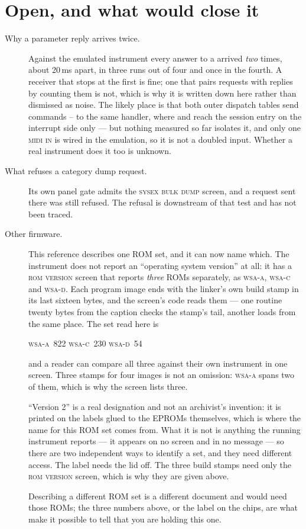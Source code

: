 \section{Open, and what would close it}
\begin{description}
\item[Why a parameter reply arrives twice.] Against the emulated instrument every answer
  to a  arrived \emph{two} times, about 20\,ms apart, in three runs out of four
  and once in the fourth. A receiver that stops at the first is fine; one that pairs
  requests with replies by counting them is not, which is why it is written down here
  rather than dismissed as noise. The likely place is that both outer dispatch tables send
  commands -- to the same handler, where  and 
  reach the session entry on the interrupt side only --- but nothing measured so far
  isolates it, and only one \textsc{midi in} is wired in the emulation, so it is not a
  doubled input. Whether a real instrument does it too is unknown.

\item[What refuses a category dump request.] Its own panel gate admits the
  \textsc{sysex bulk dump} screen, and a request sent there was still refused. The refusal
  is downstream of that test and has not been traced.

\item[Other firmware.] This reference describes one ROM set, and it can now name which.
  The instrument does not report an ``operating system version'' at all: it has a
  \textsc{rom version} screen that reports \emph{three} ROMs separately, as
  \textsc{wsa-a}, \textsc{wsa-c} and \textsc{wsa-d}. Each program image ends with the
  linker's own build stamp in its last sixteen bytes, and the screen's code reads them ---
  one routine twenty bytes from the caption checks the stamp's tail, another loads from
  the same place. The set read here is

  \begin{center}
  \textsc{wsa-a}~822 \qquad \textsc{wsa-c}~230 \qquad \textsc{wsa-d}~54
  \end{center}

  and a reader can compare all three against their own instrument in one screen. Three
  stamps for four images is not an omission: \textsc{wsa-a} spans two of them, which is why
  the screen lists three.

  ``Version 2'' is a real designation and not an archivist's invention: it is printed on
  the labels glued to the EPROMs themselves, which is where the name for this ROM set comes
  from. What it is not is anything the running instrument reports --- it appears on no
  screen and in no message --- so there are two independent ways to identify a set, and
  they need different access. The label needs the lid off. The three build stamps need only
  the \textsc{rom version} screen, which is why they are given above.

  Describing a different ROM set is a different document and would need those ROMs; the
  three numbers above, or the label on the chips, are what make it possible to tell that
  you are holding this one.
\end{description}
